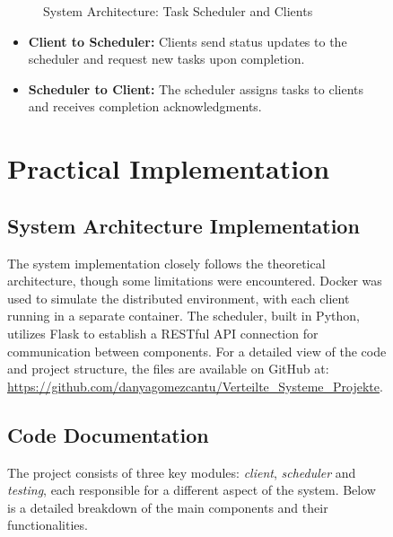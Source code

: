 \documentclass{article}
\begin{document}
\begin{figure}[h!]
\begin{figure}[h!]
\centering\caption{System Architecture: Task Scheduler and Clients}
\end{figure}

\begin{itemize}
    \item \textbf{Client to Scheduler:} Clients send status updates to the scheduler and request new tasks upon completion.
    \item \textbf{Scheduler to Client:} The scheduler assigns tasks to clients and receives completion acknowledgments.
\end{itemize}

\section{Practical Implementation}
\label{sec:section5}
\subsection{System Architecture Implementation}
The system implementation closely follows the theoretical architecture, though some limitations were encountered. Docker was used to simulate the distributed environment, with each client running in a separate container. The scheduler, built in Python, utilizes Flask to establish a RESTful API connection for communication between components. For a detailed view of the code and project structure, the files are available on GitHub at: \url{https://github.com/danyagomezcantu/Verteilte_Systeme_Projekte}.

\subsection{Code Documentation}

The project consists of three key modules: \textit{client}, \textit{scheduler} and \textit{testing}, each responsible for a different aspect of the system. Below is a detailed breakdown of the main components and their functionalities.

\begin{figure}[h!]
\centering
{}
\end{figure}
\end{figure}
\end{document}
